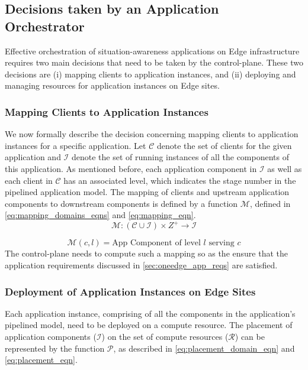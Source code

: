 \subsection{Decisions taken by an Application Orchestrator}
\label{sec:app_orch_decisions}
Effective orchestration of situation-awareness applications on Edge infrastructure requires two main decisions that need to be taken by the control-plane. These two decisions are (i) mapping clients to application instances, and (ii) deploying and managing resources for application instances on Edge sites.

\subsubsection{Mapping Clients to Application Instances}
\newcommand{\clientset}{\mathcal{C}}
\newcommand{\instanceset}{\mathcal{I}}
\newcommand{\resourceset}{\mathcal{R}}

We now formally describe the decision concerning mapping clients to application instances for a specific application. Let $\clientset$ denote the set of clients for the given application and $\instanceset$ denote the set of running instances of all the components of this application. As mentioned before, each application component in $\instanceset$ as well as each client in $\clientset$ has an associated level, which indicates the stage number in the pipelined application model. The mapping of clients and upstream application components to downstream components is defined by a function $\mathcal{M}$, defined in \cref{eq:mapping_domains_eqns} and \cref{eq:mapping_eqn}.
\begin{equation}
\label{eq:mapping_domains_eqns}
\mathcal{M} : \left( \clientset \cup \instanceset \right) \times Z^+ \rightarrow \instanceset
\end{equation}

\begin{equation}
\label{eq:mapping_eqn}
\mathcal{M} \left( c, l \right) = \text{App Component of level }l \text{ serving }c
\end{equation}
The control-plane needs to compute such a mapping so as the ensure that the application requirements discussed in \cref{sec:oneedge_app_reqs} are satisfied.

\subsubsection{Deployment of Application Instances on Edge Sites}
Each application instance, comprising of all the components in the application's pipelined model, need to be deployed on a compute resource. The placement of application components ($\instanceset$) on the set of compute resources ($\resourceset$) can be represented by the function $\mathcal{P}$, as described in \cref{eq:placement_domain_eqn} and \cref{eq:placement_eqn}.

